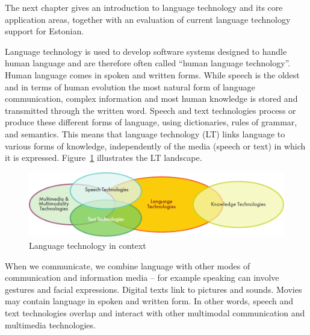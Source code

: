 \begin{multicols}{2}
The next chapter gives an introduction to language technology and its core application areas, together with an evaluation of current language technology support for Estonian.

\end{multicols}

\clearpage


\begin{multicols}{2}

Language technology is used to develop software systems designed to handle human language and are therefore often called ``human language technology''. Human language comes in spoken and written forms. While speech is the oldest and in terms of human evolution the most natural form of language communication, complex information and most human knowledge is stored and transmitted through the written word. Speech and text technologies process or produce these different forms of language, using dictionaries, rules of grammar, and semantics. This means that language technology (LT) links language to various forms of knowledge, independently of the media (speech or text) in which it is expressed. Figure~\ref{fig:ltincontext_en} illustrates the LT landscape.

\begin{figure}[htb]
  \center
  \includegraphics[width=\textwidth]{../_media/english/language_technologies}
  \caption{Language technology in context}
  \label{fig:ltincontext_en}
\end{figure}

When we communicate, we combine language with other modes of communication and information media -- for example speaking can involve gestures and facial expressions. Digital texts link to pictures and sounds. Movies may contain language in spoken and written form. In other words, speech and text technologies overlap and interact with other multimodal communication and multimedia technologies.


\end{multicols}
